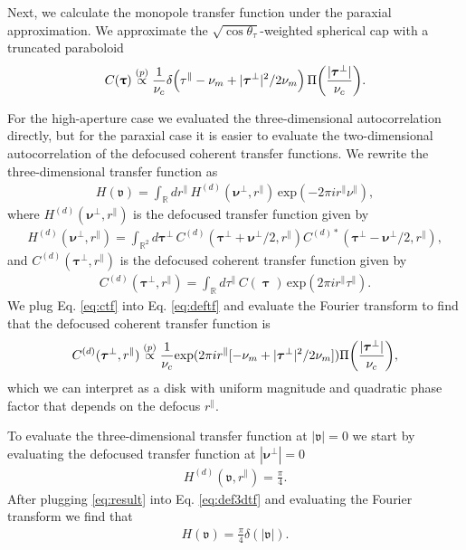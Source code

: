 \documentclass[]{osa-article}
\let\originalleft\left
\let\originalright\right
\renewcommand{\left}{\mathopen{}\mathclose\bgroup\originalleft}
\renewcommand{\right}{\aftergroup\egroup\originalright}
\newcommand{\mypar}{\parallel}
\providecommand{\mbb}[1]{\mathbb{#1}}
\providecommand{\bs}[1]{\boldsymbol{#1}}
\providecommand{\bv}{\boldsymbol{\mathfrak{v}}}
\providecommand{\bvperp}{\bs{\nu}^{\bot}}
\providecommand{\bvpar}{\nu^{\parallel}}
\providecommand{\bt}{\bs{\uptau}}
\providecommand{\btperp}{\bs{\tau}^{\bot}}
\providecommand{\btpar}{\tau^{\mypar}}
\providecommand{\propp}{\stackrel{(p)}{\propto}}
\begin{document}
Next, we calculate the monopole transfer function under the paraxial approximation. We approximate the $\sqrt{\cos\theta_\tau}$-weighted spherical cap with a truncated paraboloid
\begin{align}
  C(\bt) \propp \frac{1}{\nu_c}\delta\left(\btpar - \nu_m + |\btperp|^2/2\nu_m\right)\,\Pi\left(\frac{|\btperp|}{\nu_c}\right). \label{eq:ctf}
\end{align}

For the high-aperture case we evaluated the three-dimensional autocorrelation
directly, but for the paraxial case it is easier to evaluate the two-dimensional
autocorrelation of the defocused coherent transfer functions. We rewrite the
three-dimensional transfer function as
\begin{align}
  H(\bv) = \int_{\mbb{R}}dr^{\mypar}\,H^{(d)}(\bvperp,r^{\mypar})\,\text{exp}(-2\pi i r^{\mypar}\bvpar),\label{eq:def3dtf}
\end{align}
where $H^{(d)}(\bvperp,r^{\mypar})$ is the defocused transfer function given by
\begin{align}
  H^{(d)}(\bvperp,r^{\mypar}) = \int_{\mbb{R}^2}d\btperp\,C^{(d)}(\btperp + \bvperp/2, r^{\mypar})C^{(d)*}(\btperp - \bvperp/2, r^{\mypar}), \label{eq:defautocorr}
\end{align}
and $C^{(d)}(\btperp, r^{\mypar})$ is the defocused coherent transfer function given by
\begin{align}
  C^{(d)}(\btperp, r^{\mypar}) = \int_{\mbb{R}}d\btpar\, C(\bt)\,\text{exp}(2\pi i r^{\mypar}\btpar).\label{eq:deftf}
\end{align}
We plug Eq. \eqref{eq:ctf} into Eq. \eqref{eq:deftf} and evaluate the Fourier transform to find that the defocused coherent transfer function is
\begin{align}
  C^{(d)}(\btperp, r^{\mypar}) \propp \frac{1}{\nu_c}\text{exp}(2\pi i r^{\mypar}[-\nu_m + |\btperp|^2/2\nu_m])\Pi\left(\frac{|\btperp|}{\nu_c}\right), \label{eq:defctf}
\end{align}
which we can interpret as a disk with uniform magnitude and quadratic phase factor that depends on the defocus $r^{\mypar}$. 

To evaluate the three-dimensional transfer function at $|\bv| = 0$ we start by evaluating the defocused transfer function at $|\bvperp| = 0$
\begin{align}
  H^{(d)}(\bv, r^{\mypar}) = \frac{\pi}{4}. \label{eq:result}
\end{align}
After plugging \eqref{eq:result} into Eq. \eqref{eq:def3dtf} and evaluating the Fourier transform we find that 
\begin{align}
  H(\bv) = \frac{\pi}{4}\delta(|\bv|). 
\end{align}
\end{document}
